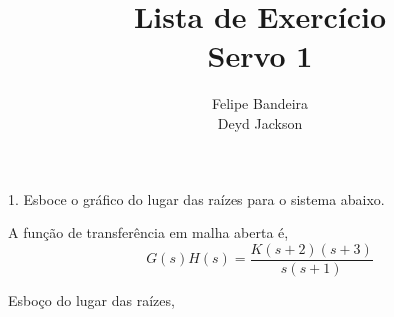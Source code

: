 \documentclass[a4paper, 10pt]{article}
\title{Lista de Exercício\\Servo 1}
\author{Felipe Bandeira\\Deyd Jackson}
\date{}
\begin{document}
\maketitle

\newpage

\listoffigures

\newpage

1. Esboce o gráfico do lugar das raízes para o sistema abaixo.

A função de transferência em malha aberta é,
\begin{equation}
    G(s) H(s) = \frac{K (s+2) (s+3)}{s(s+1)}
\end{equation}

Esboço do lugar das raízes,
\end{document}
